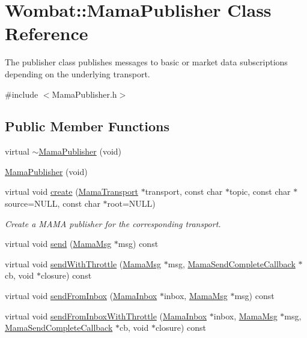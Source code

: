 \hypertarget{classWombat_1_1MamaPublisher}{
\section{Wombat::MamaPublisher Class Reference}
\label{classWombat_1_1MamaPublisher}
}


The publisher class publishes messages to basic or market data subscriptions depending on the underlying transport.  


{\ttfamily \#include $<$MamaPublisher.h$>$}\subsection*{Public Member Functions}
\begin{DoxyCompactItemize}
\item 
virtual \hyperlink{classWombat_1_1MamaPublisher_a5d7284e816e67426cb288b6eb64ddca9}{$\sim$MamaPublisher} (void)
\item 
\hyperlink{classWombat_1_1MamaPublisher_af793def52ce7ce836557c746de43fa92}{MamaPublisher} (void)
\item 
virtual void \hyperlink{classWombat_1_1MamaPublisher_ad0fdacd5fd5150799f74396e27212368}{create} (\hyperlink{classWombat_1_1MamaTransport}{MamaTransport} $\ast$transport, const char $\ast$topic, const char $\ast$source=NULL, const char $\ast$root=NULL)
\begin{DoxyCompactList}\small\item\em Create a MAMA publisher for the corresponding transport. \item\end{DoxyCompactList}\item 
virtual void \hyperlink{classWombat_1_1MamaPublisher_a8384dd52952a2ce0e178799e1ec380c9}{send} (\hyperlink{classWombat_1_1MamaMsg}{MamaMsg} $\ast$msg) const 
\item 
virtual void \hyperlink{classWombat_1_1MamaPublisher_a77970e88c69a850c451d36fcb5c720cd}{sendWithThrottle} (\hyperlink{classWombat_1_1MamaMsg}{MamaMsg} $\ast$msg, \hyperlink{classWombat_1_1MamaSendCompleteCallback}{MamaSendCompleteCallback} $\ast$cb, void $\ast$closure) const 
\item 
virtual void \hyperlink{classWombat_1_1MamaPublisher_aa50cc252ba9a6ac329fb5e3075be304b}{sendFromInbox} (\hyperlink{classWombat_1_1MamaInbox}{MamaInbox} $\ast$inbox, \hyperlink{classWombat_1_1MamaMsg}{MamaMsg} $\ast$msg) const 
\item 
virtual void \hyperlink{classWombat_1_1MamaPublisher_aa9804ff85813df84e94bdea6215ae352}{sendFromInboxWithThrottle} (\hyperlink{classWombat_1_1MamaInbox}{MamaInbox} $\ast$inbox, \hyperlink{classWombat_1_1MamaMsg}{MamaMsg} $\ast$msg, \hyperlink{classWombat_1_1MamaSendCompleteCallback}{MamaSendCompleteCallback} $\ast$cb, void $\ast$closure) const 

\end{DoxyCompactItemize}
